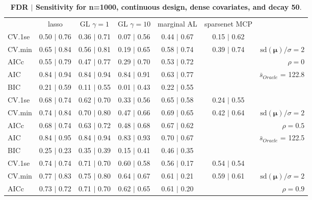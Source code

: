\begin{table}\vspace{-.5cm}
\caption[l]{ {\it }
{ \bf FDR $\boldsymbol{\mid}$ Sensitivity for n=1000, continuous design, dense covariates, and  decay  50}.}
\vspace{-.5cm}
\footnotesize{}
\begin{center}
\begin{tabular}{l*{5}{c}|r}
 & lasso & GL $\gamma=1$ & GL $\gamma=10$ & marginal AL & sparsenet MCP  & \\
 \cline{1-7}
CV.1se & 0.50 $\mid$ 0.76 & 0.36 $\mid$ 0.71 & 0.07 $\mid$ 0.56 & 0.44 $\mid$ 0.67 & 0.15 $\mid$ 0.62 & \\
CV.min & 0.65 $\mid$ 0.84 & 0.56 $\mid$ 0.81 & 0.19 $\mid$ 0.65 & 0.58 $\mid$ 0.74 & 0.39 $\mid$ 0.74 &  $\mathrm{sd}(\mathbf{\mu})/\sigma=2$ \\
AICc & 0.55 $\mid$ 0.79 & 0.47 $\mid$ 0.77 & 0.29 $\mid$ 0.70 & 0.53 $\mid$ 0.72 & & $\rho=0$ \\
AIC & 0.84 $\mid$ 0.94 & 0.84 $\mid$ 0.94 & 0.84 $\mid$ 0.91 & 0.63 $\mid$ 0.77 & &  \multirow{2}{*}{$\bar{s}_{Oracle}$ = 122.8} \\
BIC & 0.21 $\mid$ 0.59 & 0.11 $\mid$ 0.55 & 0.01 $\mid$ 0.43 & 0.22 $\mid$ 0.55 & &  \\
 \hline 
CV.1se & 0.68 $\mid$ 0.74 & 0.62 $\mid$ 0.70 & 0.33 $\mid$ 0.56 & 0.65 $\mid$ 0.58 & 0.24 $\mid$ 0.55 & \\
CV.min & 0.74 $\mid$ 0.84 & 0.70 $\mid$ 0.80 & 0.47 $\mid$ 0.66 & 0.69 $\mid$ 0.65 & 0.42 $\mid$ 0.64 &  $\mathrm{sd}(\mathbf{\mu})/\sigma=2$ \\
AICc & 0.68 $\mid$ 0.74 & 0.63 $\mid$ 0.72 & 0.48 $\mid$ 0.68 & 0.67 $\mid$ 0.62 & & $\rho=0.5$ \\
AIC & 0.84 $\mid$ 0.95 & 0.84 $\mid$ 0.94 & 0.83 $\mid$ 0.93 & 0.70 $\mid$ 0.67 & &  \multirow{2}{*}{$\bar{s}_{Oracle}$ = 122.5} \\
BIC & 0.25 $\mid$ 0.23 & 0.35 $\mid$ 0.39 & 0.15 $\mid$ 0.41 & 0.46 $\mid$ 0.35 & &  \\
 \hline 
CV.1se & 0.74 $\mid$ 0.74 & 0.71 $\mid$ 0.70 & 0.60 $\mid$ 0.58 & 0.56 $\mid$ 0.17 & 0.54 $\mid$ 0.54 & \\
CV.min & 0.77 $\mid$ 0.83 & 0.75 $\mid$ 0.80 & 0.64 $\mid$ 0.67 & 0.61 $\mid$ 0.21 & 0.59 $\mid$ 0.61 &  $\mathrm{sd}(\mathbf{\mu})/\sigma=2$ \\
AICc & 0.73 $\mid$ 0.72 & 0.71 $\mid$ 0.70 & 0.62 $\mid$ 0.65 & 0.61 $\mid$ 0.20 & & $\rho=0.9$ \\

\end{tabular}
\end{center}
\end{table}
